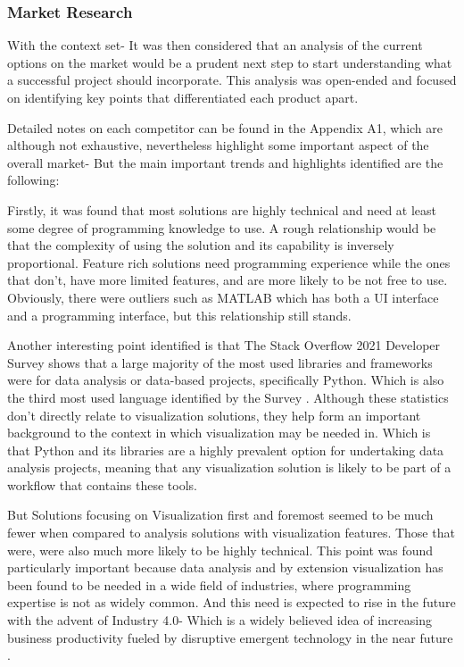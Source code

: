 \subsubsection{Market Research} \label{marketresearch}

With the context set- It was then considered that an analysis of the current options on the market would be a prudent next step to start understanding what a successful project should incorporate. This analysis was open-ended and focused on identifying key points that differentiated each product apart.

Detailed notes on each competitor can be found in the Appendix A1, which are although not exhaustive, nevertheless highlight some important aspect of the overall market- But the main important trends and highlights identified are the following:

Firstly, it was found that most solutions are highly technical and need at least some degree of programming knowledge to use. A rough relationship would be that the complexity of using the solution and its capability is inversely proportional. Feature rich solutions need programming experience while the ones that don’t, have more limited features, and are more likely to be not free to use. Obviously, there were outliers such as MATLAB which has both a UI interface and a programming interface, but this relationship still stands.

Another interesting point identified is that The Stack Overflow 2021 Developer Survey \cite[]{stackoverflow_2021_stack} shows that a large majority of the most used libraries and frameworks were for data analysis or data-based projects, specifically Python. Which is also the third most used language identified by the Survey \cite[]{stackoverflow_2021_stack}. Although these statistics don’t directly relate to visualization solutions, they help form an important background to the context in which visualization may be needed in. Which is that Python and its libraries are a highly prevalent option for undertaking data analysis projects, meaning that any visualization solution is likely to be part of a workflow that contains these tools.

But Solutions focusing on Visualization first and foremost seemed to be much fewer when compared to analysis solutions with visualization features. Those that were, were also much more likely to be highly technical. This point was found particularly important because data analysis and by extension visualization has been found to be needed in a wide field of industries, where programming expertise is not as widely common. And this need is expected to rise in the future with the advent of Industry 4.0- Which is a widely believed idea of increasing business productivity fueled by disruptive emergent technology in the near future \cite[]{GHOBAKHLOO2020119869}.

